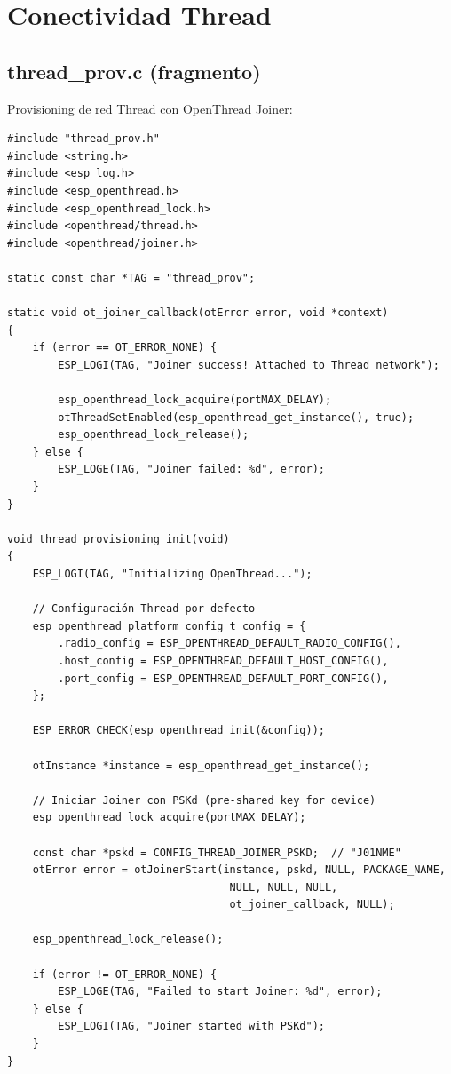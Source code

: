 \section{Conectividad Thread}

\subsection{thread\_prov.c (fragmento)}

Provisioning de red Thread con OpenThread Joiner:

\begin{verbatim}
#include "thread_prov.h"
#include <string.h>
#include <esp_log.h>
#include <esp_openthread.h>
#include <esp_openthread_lock.h>
#include <openthread/thread.h>
#include <openthread/joiner.h>

static const char *TAG = "thread_prov";

static void ot_joiner_callback(otError error, void *context)
{
    if (error == OT_ERROR_NONE) {
        ESP_LOGI(TAG, "Joiner success! Attached to Thread network");
        
        esp_openthread_lock_acquire(portMAX_DELAY);
        otThreadSetEnabled(esp_openthread_get_instance(), true);
        esp_openthread_lock_release();
    } else {
        ESP_LOGE(TAG, "Joiner failed: %d", error);
    }
}

void thread_provisioning_init(void)
{
    ESP_LOGI(TAG, "Initializing OpenThread...");
    
    // Configuración Thread por defecto
    esp_openthread_platform_config_t config = {
        .radio_config = ESP_OPENTHREAD_DEFAULT_RADIO_CONFIG(),
        .host_config = ESP_OPENTHREAD_DEFAULT_HOST_CONFIG(),
        .port_config = ESP_OPENTHREAD_DEFAULT_PORT_CONFIG(),
    };
    
    ESP_ERROR_CHECK(esp_openthread_init(&config));
    
    otInstance *instance = esp_openthread_get_instance();
    
    // Iniciar Joiner con PSKd (pre-shared key for device)
    esp_openthread_lock_acquire(portMAX_DELAY);
    
    const char *pskd = CONFIG_THREAD_JOINER_PSKD;  // "J01NME"
    otError error = otJoinerStart(instance, pskd, NULL, PACKAGE_NAME,
                                   NULL, NULL, NULL, 
                                   ot_joiner_callback, NULL);
    
    esp_openthread_lock_release();
    
    if (error != OT_ERROR_NONE) {
        ESP_LOGE(TAG, "Failed to start Joiner: %d", error);
    } else {
        ESP_LOGI(TAG, "Joiner started with PSKd");
    }
}


\end{verbatim}
